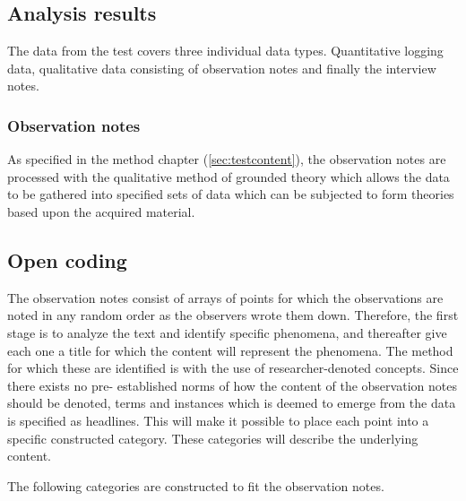 \subsection{Analysis results} \label{sec:analysisresults}
The data from the test covers three individual data types. 
Quantitative logging data, qualitative data consisting of observation notes and finally the interview notes.

\subsubsection{Observation notes}
As specified in the method chapter (\ref{sec:testcontent}), the observation notes are processed with the qualitative method of grounded theory which allows the data to be gathered into specified sets of data which can be subjected to form theories based upon the acquired material.

\subsection*{Open coding}
The observation notes consist of arrays of points for which the observations are noted in any random order as the observers wrote them down. 
Therefore, the first stage is to analyze the text and identify specific phenomena, and thereafter give each one a title for which the content will represent the phenomena. 
The method for which these are identified is with the use of researcher-denoted concepts. 
Since there exists no pre- established norms of how the content of the observation notes should be denoted, terms and instances which is deemed to emerge from the data is specified as headlines. 
This will make it possible to place each point into a specific constructed category. 
These categories will describe the underlying content.


The following categories are constructed to fit the observation notes.

